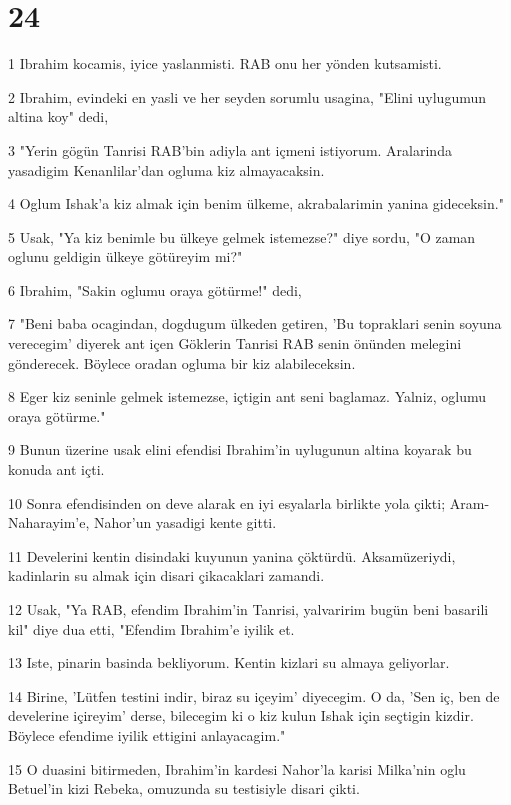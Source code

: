 \chapter{24}

\par 1 Ibrahim kocamis, iyice yaslanmisti. RAB onu her yönden kutsamisti.
\par 2 Ibrahim, evindeki en yasli ve her seyden sorumlu usagina, "Elini uylugumun altina koy" dedi,
\par 3 "Yerin gögün Tanrisi RAB'bin adiyla ant içmeni istiyorum. Aralarinda yasadigim Kenanlilar'dan ogluma kiz almayacaksin.
\par 4 Oglum Ishak'a kiz almak için benim ülkeme, akrabalarimin yanina gideceksin."
\par 5 Usak, "Ya kiz benimle bu ülkeye gelmek istemezse?" diye sordu, "O zaman oglunu geldigin ülkeye götüreyim mi?"
\par 6 Ibrahim, "Sakin oglumu oraya götürme!" dedi,
\par 7 "Beni baba ocagindan, dogdugum ülkeden getiren, 'Bu topraklari senin soyuna verecegim' diyerek ant içen Göklerin Tanrisi RAB senin önünden melegini gönderecek. Böylece oradan ogluma bir kiz alabileceksin.
\par 8 Eger kiz seninle gelmek istemezse, içtigin ant seni baglamaz. Yalniz, oglumu oraya götürme."
\par 9 Bunun üzerine usak elini efendisi Ibrahim'in uylugunun altina koyarak bu konuda ant içti.
\par 10 Sonra efendisinden on deve alarak en iyi esyalarla birlikte yola çikti; Aram-Naharayim'e, Nahor'un yasadigi kente gitti.
\par 11 Develerini kentin disindaki kuyunun yanina çöktürdü. Aksamüzeriydi, kadinlarin su almak için disari çikacaklari zamandi.
\par 12 Usak, "Ya RAB, efendim Ibrahim'in Tanrisi, yalvaririm bugün beni basarili kil" diye dua etti, "Efendim Ibrahim'e iyilik et.
\par 13 Iste, pinarin basinda bekliyorum. Kentin kizlari su almaya geliyorlar.
\par 14 Birine, 'Lütfen testini indir, biraz su içeyim' diyecegim. O da, 'Sen iç, ben de develerine içireyim' derse, bilecegim ki o kiz kulun Ishak için seçtigin kizdir. Böylece efendime iyilik ettigini anlayacagim."
\par 15 O duasini bitirmeden, Ibrahim'in kardesi Nahor'la karisi Milka'nin oglu Betuel'in kizi Rebeka, omuzunda su testisiyle disari çikti.
